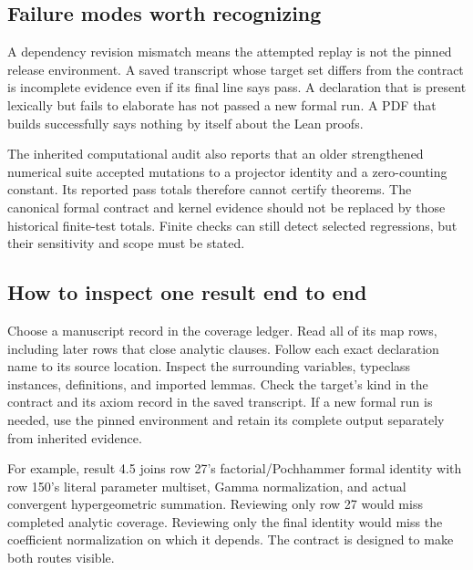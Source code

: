 \subsection{Failure modes worth recognizing}
A dependency revision mismatch means the attempted replay is not the pinned release environment. A saved transcript whose target set differs from the contract is incomplete evidence even if its final line says pass. A declaration that is present lexically but fails to elaborate has not passed a new formal run. A PDF that builds successfully says nothing by itself about the Lean proofs.

The inherited computational audit also reports that an older strengthened numerical suite accepted mutations to a projector identity and a zero-counting constant. Its reported pass totals therefore cannot certify theorems. The canonical formal contract and kernel evidence should not be replaced by those historical finite-test totals. Finite checks can still detect selected regressions, but their sensitivity and scope must be stated.

\subsection{How to inspect one result end to end}
Choose a manuscript record in the coverage ledger. Read all of its map rows, including later rows that close analytic clauses. Follow each exact declaration name to its source location. Inspect the surrounding variables, typeclass instances, definitions, and imported lemmas. Check the target's kind in the contract and its axiom record in the saved transcript. If a new formal run is needed, use the pinned environment and retain its complete output separately from inherited evidence.

For example, result 4.5 joins row 27's factorial/Pochhammer formal identity with row 150's literal parameter multiset, Gamma normalization, and actual convergent hypergeometric summation. Reviewing only row 27 would miss completed analytic coverage. Reviewing only the final identity would miss the coefficient normalization on which it depends. The contract is designed to make both routes visible.
